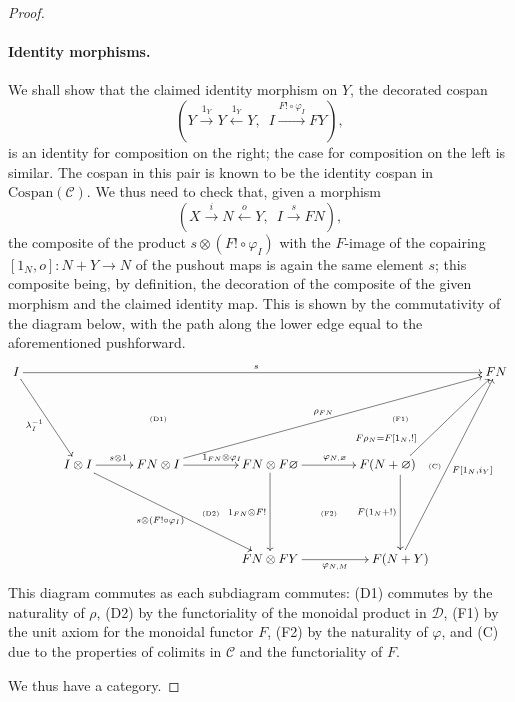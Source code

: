 \begin{proof}
\paragraph{Identity morphisms.} 
We shall show that the claimed identity morphism on $Y$, the decorated cospan
\[
  (Y \stackrel{1_Y}\longrightarrow Y \stackrel{1_Y}\longleftarrow Y,\enspace I
\xrightarrow{F!\circ \varphi_I} FY),
\]
is an identity for composition
on the right; the case for composition on the left is similar. The cospan in
this pair is known to be the identity cospan in $\mathrm{Cospan}(\mathcal C)$.
We thus need to check that, given a morphism 
\[
  (X \stackrel{i}\longrightarrow N
\stackrel{o}\longleftarrow Y,\enspace I \stackrel{s}\longrightarrow FN),
\] 
the composite of the product $s \otimes (F! \circ \varphi_I)$ with the $F$-image
of the copairing \linebreak $[1_N,o]\colon  N+Y \to N$ of the pushout maps is
again the same element $s$; this composite being, by definition, the decoration
of the composite of the given morphism and the claimed identity map. This is
shown by the commutativity of the diagram below, with the path along the lower
edge equal to the aforementioned pushforward.
\[
  \xymatrixcolsep{.96pc}
  \xymatrix{
    I \ar[rrrrrrrrrr]^s \ar[ddrr]_{\lambda_I^{-1}} &&&&&&&&&& FN \\
    &&&& \textrm{\tiny(D1)} &&&& \textrm{\tiny(F1)}\\
    && I \otimes I \ar[rr]^{s\otimes 1} \ar[ddrrrr]_{s \otimes (F! \circ
    \varphi_I)} && FN \otimes I \ar[uurrrrrr]^{\rho_{FN}} \ar[rr]^(.57){1_{FN}
  \otimes \varphi_I}
    && FN \otimes F\varnothing \ar[rr]^{\varphi_{N,\varnothing}} \ar[dd]_{1_{FN}
  \otimes F!} && F(N+\varnothing) \ar[uurr]^(.2){F\rho_N=F[1_N,!]}
      \ar[dd]_{F(1_N+!)} \quad \textrm{\tiny(C)}\\
      &&&&& \textrm{\tiny(D2)} && \textrm{\tiny(F2)}\\
      &&&&&& FN \otimes FY \ar[rr]_{\varphi_{N,M}} && F(N+Y)
      \ar[uuuurr]_{F[1_N,i_Y]}
  }
\]
This diagram commutes as each subdiagram commutes: (D1) commutes by the
naturality of $\rho$, (D2) by the functoriality of the monoidal product in
$\mathcal D$, (F1) by the unit axiom for the monoidal functor $F$, (F2) by the
naturality of $\varphi$, and (C) due to the properties of colimits in $\mathcal
C$ and the functoriality of $F$.

We thus have a category.
\end{proof}


